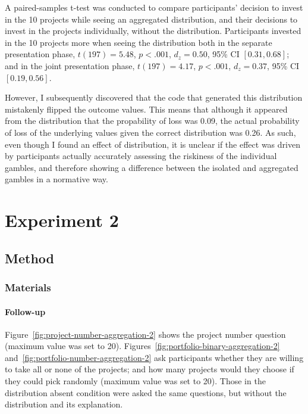 \documentclass[a4paper, nobind, dvipsnames]{templates/ociamthesis}
\theoremstyle{definition}
\theoremstyle{definition}
\theoremstyle{definition}
\theoremstyle{definition}
\theoremstyle{remark}
\begin{document}
A paired-samples t-test was conducted to compare participants' decision to
invest in the 10 projects while seeing an aggregated distribution, and their
decisions to invest in the projects individually, without the distribution.
Participants invested in the 10 projects more when seeing the distribution both
in the separate presentation phase,
\(t(197) = 5.48\), \(p < .001\), \(d_z = 0.50\), 95\% CI \([0.31, 0.68]\); and in the joint
presentation phase, \(t(197) = 4.17\), \(p < .001\), \(d_z = 0.37\), 95\% CI \([0.19, 0.56]\).

However, I subsequently discovered that the code that generated this
distribution mistakenly flipped the outcome values. This means that although it
appeared from the distribution that the propability of loss was
0.09, the actual probability of loss of the
underlying values given the correct distribution was
0.26. As such, even though I found an
effect of distribution, it is unclear if the effect was driven by participants
actually accurately assessing the riskiness of the individual gambles, and
therefore showing a difference between the isolated and aggregated gambles in a
normative way.

\section{Experiment 2}

\subsection{Method}

\subsubsection{Materials}

\hypertarget{follow-up-materials-aggregation-2-appendix}{%
\paragraph{Follow-up}\label{follow-up-materials-aggregation-2-appendix}}

Figure~\ref{fig:project-number-aggregation-2} shows the project number
question (maximum value was set to 20).
Figures~\ref{fig:portfolio-binary-aggregation-2}
and~\ref{fig:portfolio-number-aggregation-2} ask participants whether they are
willing to take all or none of the projects; and how many projects would they
choose if they could pick randomly (maximum value was set to 20). Those in the
distribution absent condition were asked the same questions, but without the
distribution and its explanation.
\end{document}
